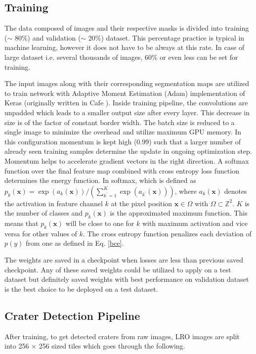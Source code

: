 \documentclass[11pt]{article}
\begin{document}
\subsection{Training}
The data composed of images and their respective masks is divided into training ($\sim$ 80\%) and validation ($\sim$ 20\%) dataset. This percentage practice is typical in machine learning, however it does not have to be always at this rate. In case of large dataset i.e. several thousands of images, 60\% or even less can be set for training.

The input images along with their corresponding segmentation maps are utilized to train network with Adaptive Moment Estimation (Adam) implementation of Keras (originally written in Cafe \cite{ronneberger2015u}). Inside training pipeline, the convolutions are unpadded which leads to a smaller output size after every layer. This decrease in size is of the factor of constant border width. The batch size is reduced to a single image to minimize the overhead and utilize maximum GPU memory. In this configuration momentum is kept high (0.99) such that a larger number of already seen training samples determine the update in ongoing optimization step. Momentum helps to accelerate gradient vectors in the right direction. A softmax function over the final feature map combined with cross entropy loss function determines the energy function. In softmax, which is defined as $p_{k}(\mathbf{x})=\exp \left(a_{k}(\mathbf{x})\right) /\left(\sum_{k^{\prime}=1}^{K} \exp \left(a_{k^{\prime}}(\mathbf{x})\right)\right)$, where $a_{k}(\mathbf{x})$ denotes the activation in feature channel $k$ at the pixel position $\mathbf{x} \in \Omega$ with $\Omega \subset \mathbb{Z}^{2}$. $K$ is the number of classes and $p_{k}(\mathbf{x})$ is the approximated maximum function. This means that $p_{k}(\mathbf{x})$ will be close to one for $k$ with maximum activation and vice versa for other values of $k$. The cross entropy function penalizes each deviation of $p(y)$ from one as defined in Eq. \ref{bce}.

The weights are saved in a checkpoint when losses are less than previous saved checkpoint. Any of these saved weights could be utilized to apply on a test dataset but definitely saved weights with best performance on validation dataset is the best choice to be deployed on a test dataset.

\subsection{Crater Detection Pipeline}
After training, to get detected craters from raw images, LRO images are split into 256 $\times$ 256 sized tiles which goes through the following.
\end{document}
